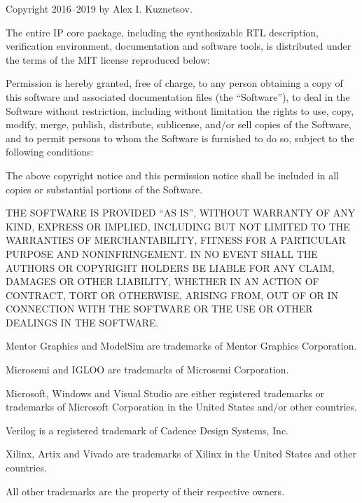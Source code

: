 {
\small
\setlength{\parindent}{0pt}
\nonzeroparskip

\vspace*{\fill}

Copyright \textcopyright{} 2016--2019 by Alex I. Kuznetsov.

The entire \lxp{} IP core package, including the synthesizable RTL description, verification environment, documentation and software tools, is distributed under the terms of the MIT license reproduced below:

Permission is hereby granted, free of charge, to any person obtaining a copy of this software and associated documentation files (the ``Software''), to deal in the Software without restriction, including without limitation the rights to use, copy, modify, merge, publish, distribute, sublicense, and/or sell copies of the Software, and to permit persons to whom the Software is furnished to do so, subject to the following conditions:

The above copyright notice and this permission notice shall be included in all copies or substantial portions of the Software.

THE SOFTWARE IS PROVIDED ``AS IS'', WITHOUT WARRANTY OF ANY KIND, EXPRESS OR IMPLIED, INCLUDING BUT NOT LIMITED TO THE WARRANTIES OF MERCHANTABILITY, FITNESS FOR A PARTICULAR PURPOSE AND NONINFRINGEMENT. IN NO EVENT SHALL THE AUTHORS OR COPYRIGHT HOLDERS BE LIABLE FOR ANY CLAIM, DAMAGES OR OTHER LIABILITY, WHETHER IN AN ACTION OF CONTRACT, TORT OR OTHERWISE, ARISING FROM, OUT OF OR IN CONNECTION WITH THE SOFTWARE OR THE USE OR OTHER DEALINGS IN THE SOFTWARE.

\vspace{4\baselineskip}

Mentor Graphics and ModelSim are trademarks of Mentor Graphics Corporation.

Microsemi and IGLOO are trademarks of Microsemi Corporation.

Microsoft, Windows and Visual Studio are either registered trademarks or trademarks of Microsoft Corporation in the United States and/or other countries.

Verilog is a registered trademark of Cadence Design Systems, Inc.

Xilinx, Artix and Vivado are trademarks of Xilinx in the United States and other countries.

All other trademarks are the property of their respective owners.
}

\cleardoublepage



\tableofcontents*
